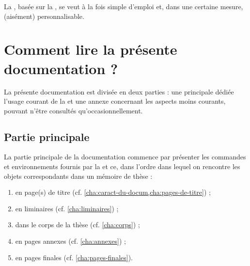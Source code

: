 La \yatcl{}, basée sur la , se veut à la fois simple d'emploi et,
dans une certaine mesure, (aisément) personnalisable.


\section{Comment lire la présente documentation ?}
\label{sec:comment-lire-cette}

La présente documentation est divisée en deux parties : une principale dédiée
l'usage courant de la \yatcl{} et une annexe concernant les aspects moins
courants, pouvant n'être consultés qu'occasionnellement.

\subsection{Partie principale}
\label{sec:partie-principale}

La partie principale de la documentation commence par présenter les commandes
et environnements fournis par la \yatcl{} et ce, dans l'ordre dans lequel on
rencontre les objets correspondants dans un mémoire de thèse :
\begin{enumerate}
\item en page(s) de titre (cf. \vref{cha:caract-du-docum,cha:pages-de-titre}) ;
\item en \glspl{liminaire} (cf. \vref{cha:liminaires}) ;
\item dans le corps de la thèse (cf. \vref{cha:corps}) ;
\item en pages annexes (cf. \vref{cha:annexes}) ;
\item en pages finales (cf. \vref{cha:pages-finales}).
\end{enumerate}

